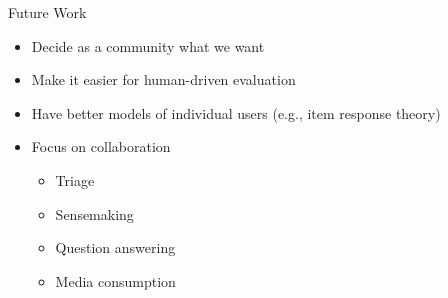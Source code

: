 \documentclass[compress]{beamer}
\begin{document}
\begin{frame}

\end{frame}


\begin{frame}{Future Work}

  \begin{itemize}
  \item Decide as a community what we want
    \item Make it easier for human-driven evaluation
    \item Have better models of individual users (e.g., item response
      theory)
    \item Focus on collaboration
      \begin{itemize}
      \item Triage
      \item Sensemaking
      \item Question answering
        \item Media consumption
      \end{itemize}
  \end{itemize}

\end{frame}
\end{document}
